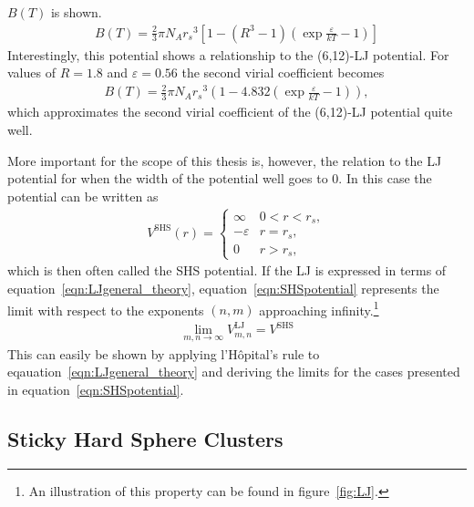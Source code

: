 $B(T)$ is shown.
%
\begin{align}
    B(T)=\frac{2}{3}\pi N_A{r_s}^3\left[1-(R^3-1)\left(\exp{\frac{\varepsilon}{kT}}-1\right)\right]
\end{align}
%
Interestingly, this potential shows a relationship to the (6,12)-\ac{LJ}
potential. For values of $R=1.8$ and $\varepsilon = 0.56$ the second virial
coefficient becomes
%
\begin{align}
    B(T)=\frac{2}{3}\pi N_A{r_s}^3\left(1-4.832\left(\exp{\frac{\varepsilon}{kT}}-1\right)\right),
\end{align}
%
which approximates the second virial coefficient of the (6,12)-\ac{LJ} potential
quite well.\autocite{Hirschfelder_Moleculartheorygases_1964}

More important for the scope of this thesis is, however, the relation to the
\ac{LJ} potential for when the width of the potential well goes to 0. In this
case the potential can be written as
%
\begin{align}
    V^\text{SHS}(r) =
    \begin{cases}
        \infty & 0 < r < r_s,\\
        -\varepsilon & r=r_s,\\
        0 & r > r_s,
    \end{cases}\label{eqn:SHSpotential}
\end{align}
%
which is then often called the \ac{SHS} potential. If the \ac{LJ} is expressed
in terms of equation~\ref{eqn:LJgeneral_theory}, equation~\ref{eqn:SHSpotential}
represents the limit with respect to the exponents $(n,m)$ approaching
infinity.\footnote{An illustration of this property can be found in
figure~\ref{fig:LJ}.}
%
\begin{align}
    \lim_{m,n\to\infty} V_{m,n}^\text{LJ} = V^\text{SHS}
\end{align}
%
This can easily be shown by applying l'H\^opital's rule to
eqauation~\ref{eqn:LJgeneral_theory} and deriving the limits for the cases
presented in equation~\ref{eqn:SHSpotential}.

\subsection{Sticky Hard Sphere Clusters}
\label{sec:SHSClusters}


